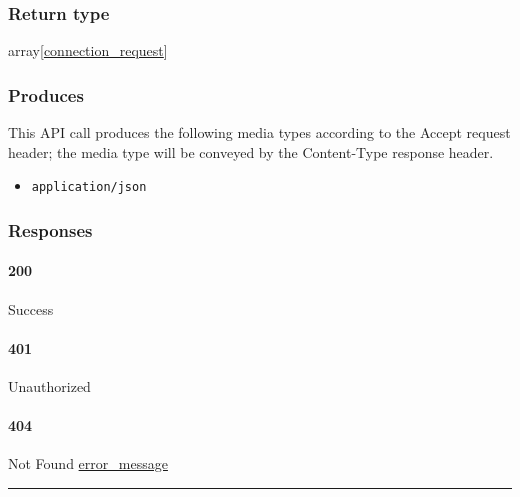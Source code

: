\hypertarget{return-type-43}{%
\subsubsection{Return type}\label{return-type-43}}

array{[}\protect\hyperlink{connection_request}{connection\_request}{]}

\hypertarget{produces-54}{%
\subsubsection{Produces}\label{produces-54}}

This API call produces the following media types according to the
{Accept} request header; the media type will be conveyed by the
{Content-Type} response header.

\begin{itemize}
\tightlist
\item
  \texttt{application/json}
\end{itemize}

\hypertarget{responses-54}{%
\subsubsection{Responses}\label{responses-54}}

\hypertarget{section-177}{%
\paragraph{200}\label{section-177}}

Success

\hypertarget{section-178}{%
\paragraph{401}\label{section-178}}

Unauthorized \protect\hyperlink{}{}

\hypertarget{section-179}{%
\paragraph{404}\label{section-179}}

Not Found \protect\hyperlink{error_message}{error\_message}

\begin{center}\rule{0.5\linewidth}{\linethickness}\end{center}

\protect\hypertarget{apiConnectionrequestPost}{}{}

